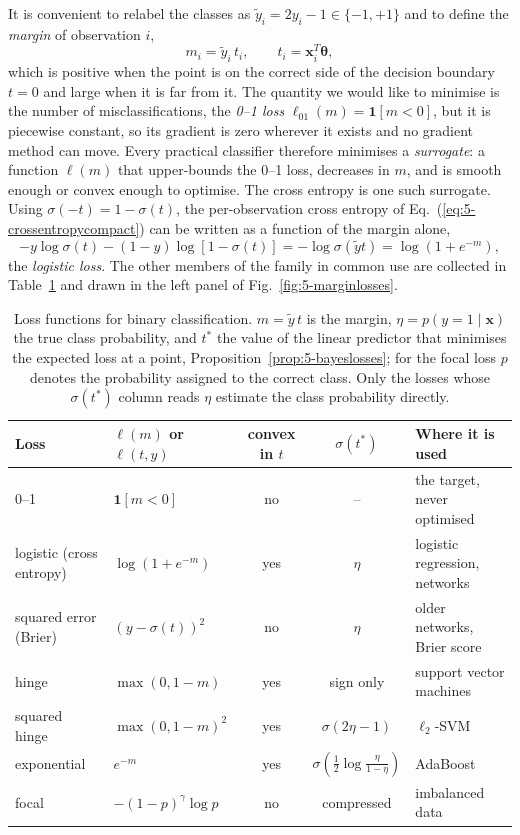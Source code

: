 It is convenient to relabel the classes as $\tilde y_i=2y_i-1\in\{-1,+1\}$ and
to define the \emph{margin} of observation $i$,
\begin{equation}
  m_i = \tilde y_i\,t_i,
  \qquad t_i=\bm{x}_i^{T}\bm{\theta},
  \label{eq:5-margin}
\end{equation}
which is positive when the point is on the correct side of the decision
boundary $t=0$ and large when it is far from it.  The quantity we would like
to minimise is the number of misclassifications, the \emph{0--1 loss}
$\ell_{01}(m)=\mathbf{1}[m<0]$, but it is piecewise constant, so its
gradient is zero wherever it exists and no gradient method can move.  Every
practical classifier therefore minimises a \emph{surrogate}: a function
$\ell(m)$ that upper-bounds the 0--1 loss, decreases in $m$, and is smooth
enough or convex enough to optimise.  The cross entropy is one such surrogate.
Using $\sigma(-t)=1-\sigma(t)$, the per-observation cross entropy of
Eq.~(\ref{eq:5-crossentropycompact}) can be written as a function of the
margin alone,
\begin{equation}
  -y\log\sigma(t)-(1-y)\log[1-\sigma(t)]
   = -\log\sigma(\tilde y t) = \log\left(1+e^{-m}\right),
  \label{eq:5-logisticloss}
\end{equation}
the \emph{logistic loss}.  The other members of the family in common use are
collected in Table~\ref{tab:5-losses} and drawn in the left panel of
Fig.~\ref{fig:5-marginlosses}.

\begin{table}[htbp]
\centering
\small
\renewcommand{\arraystretch}{1.3}
\setlength{\tabcolsep}{4pt}
\begin{tabular}{@{}llccl@{}}
\toprule
\textbf{Loss} & $\ell(m)$ or $\ell(t,y)$ & convex in $t$ & $\sigma(t^{*})$ &
  \textbf{Where it is used}\\
\midrule
0--1 & $\mathbf{1}[m<0]$ & no & -- & the target, never optimised\\
logistic (cross entropy) & $\log(1+e^{-m})$ & yes & $\eta$ & logistic regression, networks\\
squared error (Brier) & $(y-\sigma(t))^{2}$ & no & $\eta$ & older networks, Brier score\\
hinge & $\max(0,1-m)$ & yes & sign only & support vector machines\\
squared hinge & $\max(0,1-m)^{2}$ & yes & $\sigma(2\eta-1)$ & $\ell_2$-SVM\\
exponential & $e^{-m}$ & yes & $\sigma(\tfrac12\log\frac{\eta}{1-\eta})$ & AdaBoost\\
focal & $-(1-p)^{\gamma}\log p$ & no & compressed & imbalanced data\\
\bottomrule
\end{tabular}
\caption{Loss functions for binary classification.  $m=\tilde y\,t$ is the
margin, $\eta=p(y=1\mid\bm{x})$ the true class probability, and $t^{*}$ the
value of the linear predictor that minimises the expected loss at a point,
Proposition~\ref{prop:5-bayeslosses}; for the focal loss $p$ denotes the
probability assigned to the correct class.  Only the losses whose $\sigma(t^{*})$
column reads $\eta$ estimate the class probability directly.}
\label{tab:5-losses}
\end{table}

